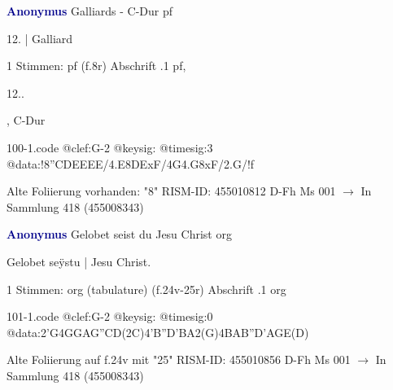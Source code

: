 \documentclass[twocolumn]{book}
\begin{document}
\newline \par \vspace{7pt} \textcolor{darkblue}{\textbf{Anonymus  }}
\newline Galliards - C-Dur
\newline pf
\newline \begin{itshape}[f.8r, at left:] 12. | Galliard\end{itshape} 
\newline \textcolor{darkblue}{}  1 Stimmen: pf  (f.8r)
\newline Abschrift
.1  pf, \begin{itshape}12..\end{itshape}, C-Dur  
\begin{filecontents*}{100-1.code}
@clef:G-2
@keysig:
@timesig:3
@data:!{8''CDEEEE}/4.E{8DExF}/4G4.G8xF/2.G/!f
\end{filecontents*}
\newline
%
\newline Alte Foliierung vorhanden: "8"
\newline RISM-ID: 455010812
\newline D-Fh  Ms 001
\newline $\rightarrow$ In Sammlung 418 (455008343)
      
\newline \par \vspace{7pt} \textcolor{darkblue}{\textbf{Anonymus  }}
\newline Gelobet seist du Jesu Christ
\newline org
\newline \begin{itshape}[f.24v, at left:] Gelobet seÿstu | Jesu Christ.\end{itshape} 
\newline \textcolor{darkblue}{}  1 Stimmen: org (tabulature)  (f.24v-25r)
\newline Abschrift
.1  org  
\begin{filecontents*}{101-1.code}
@clef:G-2
@keysig:
@timesig:0
@data:2'G4GGAG''CD(2C)4'B''D'BA2(G)4BAB''D'AGE(D)
\end{filecontents*}
\newline
%
\newline Alte Foliierung auf f.24v mit "25"
\newline RISM-ID: 455010856
\newline D-Fh  Ms 001
\newline $\rightarrow$ In Sammlung 418 (455008343)
      
\end{document}
